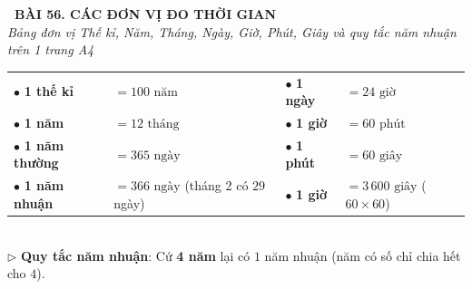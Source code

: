 \documentclass[14pt,a4paper,oneside]{extbook}
\begin{document}
\noindent
\begin{tcolorbox}[
  enhanced,
  colback=teal!8!white,
  colframe=teal!80!black,
  arc=3mm,
  boxrule=1.1pt,
  width=\linewidth,
  halign=center,
  top=2.2mm, bottom=2.2mm,
  left=3mm, right=3mm,
  drop fuzzy shadow
]
  {\large\bfseries\color{teal!95!black}\faBookmark\ BÀI 56. CÁC ĐƠN VỊ ĐO THỜI GIAN}\\[2pt]
  {\scriptsize\color{black!75}\itshape Bảng đơn vị Thế kỉ, Năm, Tháng, Ngày, Giờ, Phút, Giây và quy tắc năm nhuận trên 1 trang A4}
\end{tcolorbox}

\vspace{3.2mm}
\noindent
\begin{tcolorbox}[
  enhanced,
  title={\footnotesize\bfseries\color{white}\faClockO\ 1. Bảng chuyển đổi các đơn vị đo thời gian},
  colback=blue!2!white,
  colframe=blue!75!black,
  arc=2.5mm, boxrule=0.8pt, top=1.8mm, bottom=1.8mm, left=2.5mm, right=2.5mm
]
  \footnotesize
  \begin{tabular}{ll|ll}
    $\bullet$ \textbf{1 thế kỉ} & $= 100\text{ năm}$ & $\bullet$ \textbf{1 ngày} & $= 24\text{ giờ}$ \\
    $\bullet$ \textbf{1 năm} & $= 12\text{ tháng}$ & $\bullet$ \textbf{1 giờ} & $= 60\text{ phút}$ \\
    $\bullet$ \textbf{1 năm thường} & $= 365\text{ ngày}$ & $\bullet$ \textbf{1 phút} & $= 60\text{ giây}$ \\
    $\bullet$ \textbf{1 năm nhuận} & $= 366\text{ ngày}$ (tháng 2 có $29$ ngày) & $\bullet$ \textbf{1 giờ} & $= 3\,600\text{ giây}$ ($60 \times 60$)
  \end{tabular}\\[3pt]
  $\triangleright$ \textbf{Quy tắc năm nhuận}: Cứ \textbf{4 năm} lại có $1$ năm nhuận (năm có số chỉ chia hết cho $4$).
\end{tcolorbox}

\vspace{3mm}
\end{document}

